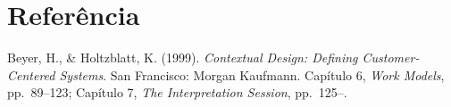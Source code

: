 \documentclass[11pt,a4paper]{article}
\begin{document}
\section*{Referência}
Beyer, H., \& Holtzblatt, K. (1999). \textit{Contextual Design: Defining Customer-Centered Systems}. San Francisco: Morgan Kaufmann. Capítulo 6, \textit{Work Models}, pp.~89--123; Capítulo 7, \textit{The Interpretation Session}, pp.~125--.
\end{document}
